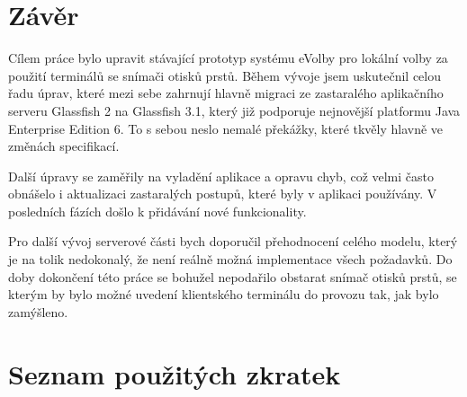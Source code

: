 \documentclass[11pt,twoside,a4paper]{book}
\begin{document}
\chapter{Závěr}

Cílem práce bylo upravit stávající prototyp systému eVolby\cite{www:prototyp} pro lokální volby za použití terminálů se snímači otisků prstů. Během vývoje jsem uskutečnil celou řadu úprav, které mezi sebe zahrnují hlavně migraci ze zastaralého aplikačního serveru Glassfish 2 na Glassfish 3.1, který již podporuje nejnovější platformu Java Enterprise Edition 6. To s sebou neslo nemalé překážky, které tkvěly hlavně ve změnách specifikací. 

Další úpravy se zaměřily na vyladění aplikace a opravu chyb, což velmi často obnášelo i aktualizaci zastaralých postupů, které byly v aplikaci používány. V posledních fázích došlo k přidávání nové funkcionality.

Pro další vývoj serverové části bych doporučil přehodnocení celého modelu, který je na tolik nedokonalý, že není reálně možná implementace všech požadavků. Do doby dokončení této práce se bohužel nepodařilo obstarat snímač otisků prstů, se kterým by bylo možné uvedení klientského terminálu do provozu tak, jak bylo zamýšleno.




%
%
%
%




\appendix

\chapter{Seznam použitých zkratek}
\end{document}
